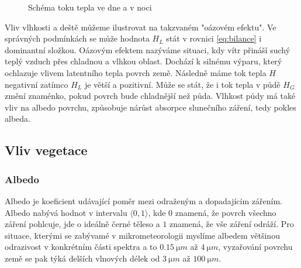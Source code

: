 \begin{figure}
\centering
\caption{Schéma toku tepla ve dne a v noci}
\label{fig:schema}
\end{figure}

Vliv vlhkosti a deště můžeme ilustrovat na takzvaném "oázovém efektu". Ve správných podmínkách se může hodnota $H_L$ stát v rovnici \eqref{eq:bilance} i dominantní složkou. Oázovým efektem nazýváme situaci, kdy vítr přináší suchý teplý vzduch přes chladnou a vlhkou oblast. Dochází k silnému výparu, který ochlazuje vlivem latentního tepla povrch země. Následně máme tok tepla $H$ negativní zatímco $H_L$ je větší a pozitivní. Může se stát, že i tok tepla v půdě $H_G$ změní znaménko, pokud povrch bude chladnější než půda. Vlhkost půdy má také vliv na albedo povrchu, způsobuje nárůst absorpce slunečního záření, tedy pokles albeda\cite{arya2001}.

\subsection{Vliv vegetace} \label{chap:veg}
\subsubsection{Albedo}
Albedo je koeficient udávající poměr mezi odraženým a dopadajícím zářením. Albedo nabývá hodnot v intervalu $\langle 0,1\rangle$, kde $0$ znamená, že povrch všechno záření pohlcuje, jde o ideálně černé těleso a $1$ znamená, že vše záření odráží. Pro situace, kterými se zabývamé v mikrometeorologii myslíme albedem většinou odrazivost v konkrétním části spektra a to $\SI{0.15}{\micro m}$ až $\SI{4}{\micro m}$, vyzařování povrchu země se pak týká delších vlnových délek od $\SI{3}{\micro m}$ až $\SI{100}{\micro m}$. 


